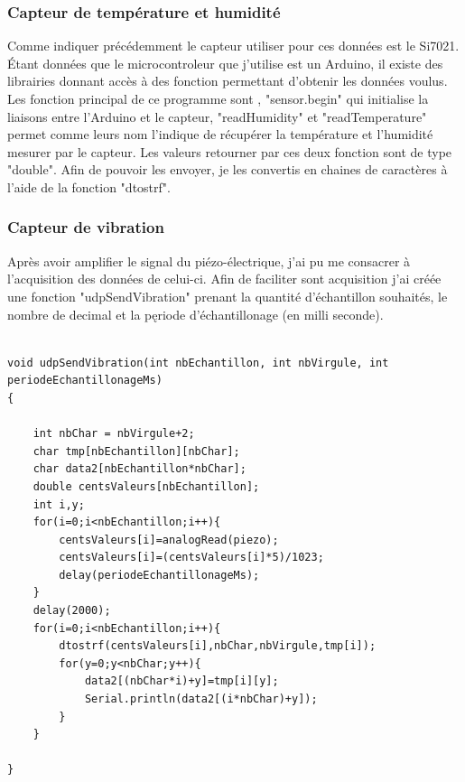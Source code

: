 \documentclass[11pt,french,a4paper]{article}
\begin{document}
\subsubsection{Capteur de température et humidité}
Comme indiquer précédemment le capteur utiliser pour ces données est le Si7021. Étant données que le microcontroleur que j'utilise est un Arduino, il existe des librairies donnant accès à des fonction permettant d'obtenir les données voulus.
Les fonction principal de ce programme sont , "sensor.begin" qui initialise la liaisons entre l'Arduino et le capteur, "readHumidity" et "readTemperature" permet comme leurs nom l'indique de récupérer la température et l'humidité mesurer par le capteur. Les valeurs retourner par ces deux fonction sont de type "double". Afin de pouvoir les envoyer, je les convertis en chaines de caractères à l'aide de la fonction "dtostrf".

\subsubsection{Capteur de vibration}
Après avoir amplifier le signal du piézo-électrique, j'ai pu me consacrer à l'acquisition des données de celui-ci. Afin de faciliter sont acquisition j'ai créée une fonction "udpSendVibration" prenant la quantité d'échantillon souhaités, le nombre de decimal et la pęriode d'échantillonage (en milli seconde).

\begin{scriptsize}
\begin{lstlisting}

void udpSendVibration(int nbEchantillon, int nbVirgule, int periodeEchantillonageMs)
{

	int nbChar = nbVirgule+2;
	char tmp[nbEchantillon][nbChar];
	char data2[nbEchantillon*nbChar];
	double centsValeurs[nbEchantillon];
	int i,y;
	for(i=0;i<nbEchantillon;i++){
		centsValeurs[i]=analogRead(piezo);
		centsValeurs[i]=(centsValeurs[i]*5)/1023;
		delay(periodeEchantillonageMs);
	}
	delay(2000);
	for(i=0;i<nbEchantillon;i++){
		dtostrf(centsValeurs[i],nbChar,nbVirgule,tmp[i]);
		for(y=0;y<nbChar;y++){
			data2[(nbChar*i)+y]=tmp[i][y];
			Serial.println(data2[(i*nbChar)+y]);	
		}	
	}

}
\end{lstlisting}
\end{scriptsize} 
\end{document}
